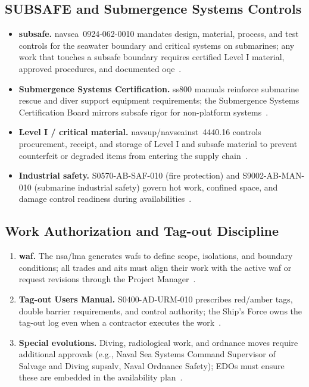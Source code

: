 \documentclass[../main.tex]{subfiles}
\begin{document}
\subsection{SUBSAFE and Submergence Systems Controls}
\begin{itemize}
  \item \textbf{\ac{subsafe}.} \ac{navsea}~0924-062-0010 mandates design, material, process, and test controls for the seawater boundary and critical systems on submarines; any work that touches a \ac{subsafe} boundary requires certified Level I material, approved procedures, and documented \ac{oqe}~\autocite{NAVSEA-0924-062-0010}.
  \item \textbf{Submergence Systems Certification.} \ac{ss800} manuals reinforce submarine rescue and diver support equipment requirements; the Submergence Systems Certification Board mirrors \ac{subsafe} rigor for non-platform systems~\autocite{SS800-AG-MAN-010}.
  \item \textbf{Level I / critical material.} \ac{navsup}/\ac{navseainst}~4440.16 controls procurement, receipt, and storage of Level I and \ac{subsafe} material to prevent counterfeit or degraded items from entering the supply chain~\autocite{NAVSEA-4440-16}.
  \item \textbf{Industrial safety.} S0570-AB-SAF-010 (fire protection) and S9002-AB-MAN-010 (submarine industrial safety) govern hot work, confined space, and damage control readiness during availabilities~\autocite{S0570-AB-SAF-010,S9002-AB-MAN-010}.
\end{itemize}

\subsection{Work Authorization and Tag-out Discipline}
\begin{enumerate}
  \item \textbf{\ac{waf}.} The \ac{nsa}/\ac{lma} generates \acp{waf} to define scope, isolations, and boundary conditions; all trades and \acp{ait} must align their work with the active \ac{waf} or request revisions through the Project Manager~\autocite{COMFLTFORCOMINST4790-3}.
  \item \textbf{Tag-out Users Manual.} S0400-AD-URM-010 prescribes red/amber tags, double barrier requirements, and control authority; the Ship's Force owns the tag-out log even when a contractor executes the work~\autocite{S0400-AD-URM-010}.
  \item \textbf{Special evolutions.} Diving, radiological work, and ordnance moves require additional approvals (e.g., Naval Sea Systems Command Supervisor of Salvage and Diving \ac{supsalv}, Naval Ordnance Safety); EDOs must ensure these are embedded in the availability plan~\autocite{NAVSEA-4740-2H,edo-4-1-5-waterfront-work-control-2025}.
\end{enumerate}
\end{document}
